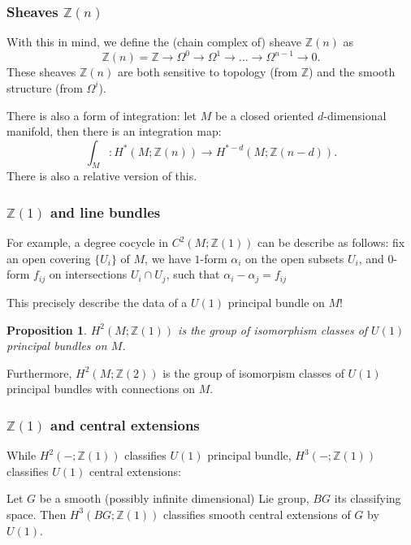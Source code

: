 \documentclass{beamer}
\newcommand{\Z}{\mathbb Z}
\newtheorem{prop}[equation]{Proposition}
\begin{document}
\begin{frame}
    \frametitle{Sheaves $\Z(n)$}
    With this in mind, we define the (chain complex of) sheave $\Z(n)$ as 
    \begin{equation}
        \Z(n) = \Z \to \Omega^0 \to \Omega^1 \to \dots \to \Omega^{n-1} \to 0.
    \end{equation} \pause 
    These sheaves $\Z(n)$ are both sensitive to topology (from $\Z$) and the smooth 
    structure (from $\Omega^i$). \pause \vspace{5mm}

    There is also a form of integration: let $M$ be a closed oriented $d$-dimensional 
    manifold, then there is an integration map:
    \begin{equation}
        \int_M: H^*(M; \Z(n)) \to H^{*-d}(M; \Z(n-d)).
    \end{equation}
    There is also a relative version of this.
\end{frame}

\begin{frame}
    \frametitle{$\Z(1)$ and line bundles}
    For example, a degree cocycle in $C^2(M; \Z(1))$ can be describe as follows:
    fix an open covering $\{U_i\}$ of $M$, we have $1$-form $\alpha_i$ on 
    the open subsets $U_i$, and $0$-form $f_{ij}$ on intersections $U_i \cap U_j$, such that 
    $\alpha_i- \alpha_j = f_{ij}$\pause \vspace{5mm}

    This precisely describe the data of a $U(1)$ principal bundle on $M$!
    \begin{prop}
        $H^2(M; \Z(1))$ is the group of isomorphism classes of $U(1)$ principal bundles on $M$.
    \end{prop}

    Furthermore, $H^2(M; \Z(2))$ is the group of isomorpism classes of $U(1)$ principal bundles with connections on $M$.
\end{frame}

\begin{frame}
    \frametitle{$\Z(1)$ and central extensions}
    While $H^2(-; \Z(1))$ classifies $U(1)$ principal bundle, $H^3(-; \Z(1))$ classifies 
    $U(1)$ central extensions:

    \begin{theorem}
        Let $G$ be a smooth (possibly infinite dimensional) Lie group, $BG$ 
        its classifying space. Then 
        $H^3(BG; \Z(1))$ classifies smooth central extensions of $G$ by $U(1)$.
    \end{theorem}
\end{frame}
\end{document}
